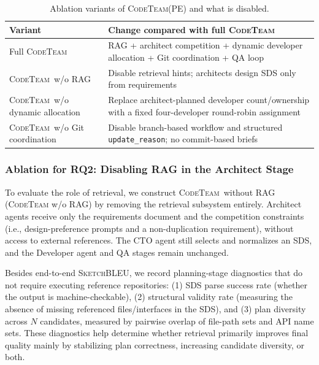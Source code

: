 \documentclass[format=acmsmall, review=false, screen=true]{acmart}
\newcommand{\tool}{\textsc{CodeTeam}\xspace}
\newcommand{\sketchbleu}{\textsc{SketchBLEU}\xspace}
\begin{document}
\begin{table}[t]
\centering
\small
\caption{Ablation variants of \tool (PE) and what is disabled.}
\label{tab:ablation-variants}
\begin{tabular}{@{}p{2.8cm}p{10cm}@{}}
\toprule
Variant & Change compared with full \tool \\
\midrule
Full \tool & RAG + architect competition + dynamic developer allocation + Git coordination + QA loop \\
\tool\ w/o RAG & Disable retrieval hints; architects design SDS only from requirements \\
\tool\ w/o dynamic allocation & Replace architect-planned developer count/ownership with a fixed four-developer round-robin assignment \\
\tool\ w/o Git coordination & Disable branch-based workflow and structured \texttt{update\_reason}; no commit-based briefs \\
\bottomrule
\end{tabular}
\end{table}

\subsubsection{Ablation for RQ2: Disabling RAG in the Architect Stage}\label{subsubsec:ablation-rag}
To evaluate the role of retrieval, we construct \tool\ without RAG (\tool w/o RAG) by removing the retrieval subsystem entirely. Architect agents receive only the requirements document and the competition constraints (i.e., design-preference prompts and a non-duplication requirement), without access to external references. The CTO agent still selects and normalizes an SDS, and the Developer agent and QA stages remain unchanged.

Besides end-to-end \sketchbleu, we record planning-stage diagnostics that do not require executing reference repositories: (1) SDS parse success rate (whether the output is machine-checkable), (2) structural validity rate (measuring the absence of missing referenced files/interfaces in the SDS), and (3) plan diversity across $N$ candidates, measured by pairwise overlap of file-path sets and API name sets. These diagnostics help determine whether retrieval primarily improves final quality mainly by stabilizing plan correctness, increasing candidate diversity, or both.
\end{document}
